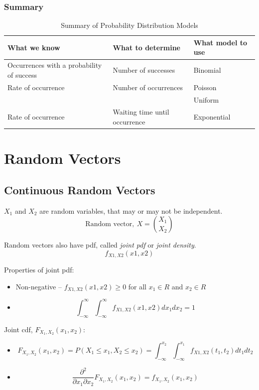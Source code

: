\documentclass{report}
\begin{document}
\subsubsection{Summary}

\begin{table}[H]
\centering
\caption{Summary of Probability Distribution Models}
\small
\begin{tabular}{lll}
\toprule
 \textbf{What we know} & \textbf{What to determine} & \textbf{What model to use} \\
 \midrule
 Occurrences with a probability of success & Number of successes & Binomial \\
  Rate of occurrence & Number of occurrences & Poisson \\
   &  & Uniform \\

  Rate of occurrence  & Waiting time until occurrence & Exponential \\

  \bottomrule
\end{tabular}
\end{table}


\section{Random Vectors}

\subsection{Continuous Random Vectors}

$X_1$ and $X_2$ are random variables, that may or may not be independent. 
$$\text{Random vector},\ X = {X_1 \choose X_2}$$

Random vectors also have pdf, called \textit{joint pdf} or \textit{joint density}. 
$$f_{X1,X2} (x1, x2)$$

Properties of joint pdf:

\begin{itemize}
\item Non-negative -- $f_{X1,X2} (x1, x2) \geq 0$ for all $x_1 \in R$ and $x_2 \in R$
\item $$\int_{-\infty}^\infty\int_{-\infty}^\infty f_{X1,X2} (x1, x2) dx_1 dx_2 = 1$$
\end{itemize}

Joint cdf, $F_{X_1, X_2}(x_1, x_2)$:

\begin{itemize}
\item $$F_{X_1, X_2}(x_1, x_2) = P(X_1 \leq x_1, X_2 \leq x_2) = \int_{-\infty}^{x_2}\int_{-\infty}^{x_1} f_{X1,X2} (t_1, t_2) dt_1 dt_2 $$

\item $$\frac{\partial^2}{\partial x_1 \partial x_2} F_{X_1, X_2} (x_1, x_2) = f_{X_1, X_2}(x_1, x_2)$$
\end{itemize}
\end{document}
